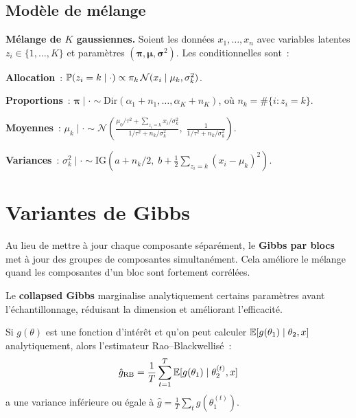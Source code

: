 \subsection{Mod\`ele de m\'elange}

\begin{exemple}
\textbf{M\'elange de $K$ gaussiennes.} Soient les donn\'ees
$x_1, \ldots, x_n$ avec variables latentes $z_i \in \{1, \ldots, K\}$
et param\`etres $(\boldsymbol{\pi}, \boldsymbol{\mu}, \boldsymbol{\sigma}^2)$.
Les conditionnelles sont~:

\textbf{Allocation}~:
$\mathbb{P}(z_i = k \mid \cdot) \propto \pi_k\,\mathcal{N}(x_i \mid \mu_k, \sigma_k^2)$.

\textbf{Proportions}~:
$\boldsymbol{\pi} \mid \cdot \sim \text{Dir}(\alpha_1 + n_1, \ldots, \alpha_K + n_K)$,
o\`u $n_k = \#\{i : z_i = k\}$.

\textbf{Moyennes}~:
$\mu_k \mid \cdot \sim \mathcal{N}\!\left(\frac{\mu_0/\tau^2 + \sum_{z_i=k} x_i/\sigma_k^2}{1/\tau^2 + n_k/\sigma_k^2},\;
\frac{1}{1/\tau^2 + n_k/\sigma_k^2}\right)$.

\textbf{Variances}~:
$\sigma_k^2 \mid \cdot \sim \text{IG}\!\left(a + n_k/2,\;
b + \frac{1}{2}\sum_{z_i=k}(x_i - \mu_k)^2\right)$.
\end{exemple}

\section{Variantes de Gibbs}

\begin{definition}
Au lieu de mettre \`a jour chaque composante s\'epar\'ement, le
\textbf{Gibbs par blocs} met \`a jour des groupes de composantes
simultan\'ement. Cela am\'eliore le m\'elange quand les composantes
d'un bloc sont fortement corr\'el\'ees.
\end{definition}

\begin{definition}
Le \textbf{collapsed Gibbs} marginalise analytiquement certains
param\`etres avant l'\'echantillonnage, r\'eduisant la dimension et
am\'eliorant l'efficacit\'e.
\end{definition}

\begin{theoreme}
Si $g(\theta)$ est une fonction d'int\'er\^et et qu'on peut calculer
$\mathbb{E}[g(\theta_1) \mid \theta_2, x]$ analytiquement, alors l'estimateur
Rao--Blackwellis\'e~:
\[
  \hat{g}_{\text{RB}} = \frac{1}{T}\sum_{t=1}^T
  \mathbb{E}[g(\theta_1) \mid \theta_2^{(t)}, x]
\]
a une variance inf\'erieure ou \'egale \`a $\hat{g} = \frac{1}{T}\sum_t g(\theta_1^{(t)})$.
\end{theoreme}

